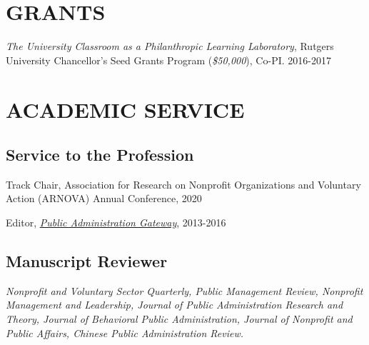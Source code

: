 \documentclass[letterpaper]{article}
\renewenvironment{itemize}{
  \begin{list}{}{
    \setlength{\leftmargin}{1.5em}
  }
}{
  \end{list}
}
\begin{document}
\bigskip


\section*{GRANTS}
\begin{itemize}
	
\item {\it The University Classroom as a Philanthropic Learning Laboratory}, Rutgers University Chancellor's Seed Grants Program ({\it \$50,000}), Co-PI. 2016-2017

\end{itemize}

\bigskip

\section*{ACADEMIC SERVICE}
\subsection*{Service to the Profession}
\begin{itemize}
	
\item Track Chair, Association for Research on Nonprofit Organizations and Voluntary Action (ARNOVA) Annual Conference, 2020

\item Editor, \href{https://pagateway.newark.rutgers.edu/}{\it Public Administration Gateway}, 2013-2016

\end{itemize}

\subsection*{Manuscript Reviewer}
\begin{itemize}
	
\item {\it Nonprofit and Voluntary Sector Quarterly, Public Management Review, Nonprofit Management and Leadership, Journal of Public Administration Research and Theory, Journal of Behavioral Public Administration, Journal of Nonprofit and Public Affairs, Chinese Public Administration Review.}

\end{itemize}

\bigskip
\end{document}
